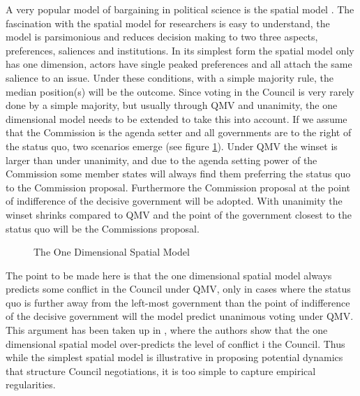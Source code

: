 A very popular model of bargaining in political science is the spatial model \citep{Downs1957}.  The fascination with the spatial model for researchers is easy to understand, the model is parsimonious and reduces decision making to two three aspects, preferences, saliences and institutions. In its simplest form the spatial model only has one dimension, actors have single peaked preferences and all attach the same salience to an issue. Under these conditions, with a simple majority rule, the median position(s) will be the outcome. Since voting in the Council is very rarely done by a simple majority, but usually through QMV and unanimity, the one dimensional model needs to be extended to take this into account. If we assume that the Commission is the agenda setter and all governments are to the right of the status quo, two scenarios emerge (see figure \ref{fig:matillalane}). Under QMV the winset is larger than under unanimity, and due to the agenda setting power of the Commission some member states will always find them preferring the status quo to the Commission proposal. Furthermore the Commission proposal at the point of indifference of the decisive government will be adopted. With unanimity the winset shrinks compared to QMV and the point of the government closest to the status quo will be the Commissions proposal. 

\begin{figure}[h]
  \centering
  \caption{The One Dimensional Spatial Model}
  \label{fig:matillalane}
\end{figure}

The point to be made here is that the one dimensional spatial model always predicts some conflict in the Council under QMV, only in cases where the status quo is further away from the left-most government than the point of indifference of the decisive government will the model predict unanimous voting under QMV. This argument has been taken up in \citet{MattilaLane2001}, where the authors show that the one dimensional spatial model over-predicts the level of conflict i the Council. Thus while the simplest spatial model is illustrative in proposing potential dynamics that structure Council negotiations, it is too simple to capture empirical regularities. 

